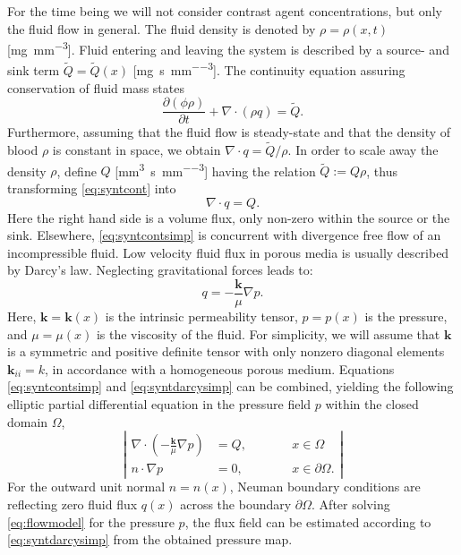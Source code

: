 \documentclass[journal,twocolumn]{IEEEtran}
\newcommand{\siQmm}{\milli\meter\cubed\per\second\per\milli\meter\cubed}
\newcommand{\siQtilde}{\milli\gram\per\second\per\milli\meter\cubed}
\begin{document}
	For the time being we will not consider contrast agent concentrations, but only the fluid flow in general.
	The fluid density is denoted by $\rho = \rho(x,t)$ [\si{\milli\gram\per\mm\cubed}]. 
	Fluid entering and leaving the system is described by a source- and sink term $\tilde{Q} = \tilde{Q}(x)$ [\si{\siQtilde}]. 
	The continuity equation assuring conservation of fluid mass states
	\begin{equation}
		\frac{\partial (\phi \rho)}{\partial t} + \nabla \cdot (\rho q) = \tilde{Q}.
		\label{eq:syntcont}
	\end{equation} 
	Furthermore, assuming that the fluid flow is steady-state and that the density of blood $\rho$ is constant in space, we obtain $\nabla \cdot q = \tilde{Q}/\rho$.
	In order to scale away the density $\rho$, define $Q$ [\si{\siQmm}] having the relation $\tilde{Q} := Q\rho$, thus transforming \eqref{eq:syntcont} into 
	\begin{equation}
		\nabla \cdot q = Q.
		\label{eq:syntcontsimp}
	\end{equation}
	Here the right hand side is a volume flux, only non-zero within the source or the sink. 
	Elsewhere, \eqref{eq:syntcontsimp} is concurrent with divergence free flow of an incompressible fluid.
	Low velocity fluid flux in porous media is usually described by Darcy's law. 	Neglecting gravitational forces \cite{Darcy56} leads to:
	\begin{equation}
		q = -\frac{\mathbf{k}}{\mu} \nabla p.
		\label{eq:syntdarcysimp}
	\end{equation}
	Here, $\mathbf{k} = \mathbf{k}(x)$ is the intrinsic permeability tensor, $p=p(x)$ is the pressure, and $\mu = \mu(x)$ is the viscosity of the fluid. 	
	For simplicity, we will assume that $\mathbf{k}$ is a symmetric and positive definite tensor with only nonzero diagonal elements $\mathbf{k}_{ii} = k$, in accordance with a homogeneous porous medium.	
	Equations \eqref{eq:syntcontsimp} and \eqref{eq:syntdarcysimp} can be combined, yielding the following elliptic partial differential equation in the pressure field $p$ within the closed domain $\Omega$,
	\begin{equation}
		\left\vert
		\begin{alignedat}{2}
			\nabla \cdot \left( -\frac{\mathbf{k}}{\mu} \nabla p \right) &= Q,  \qquad &&x \in \Omega \\
			n \cdot \nabla p &=0, &&x \in \partial \Omega.
		\end{alignedat}
		\right\vert 
		\label{eq:flowmodel}
	\end{equation}
	For the outward unit normal $n=n(x)$, Neuman boundary conditions are reflecting zero fluid flux $q(x)$ across the boundary $\partial \Omega$.
	After solving \eqref{eq:flowmodel} for the pressure $p$, the flux field can be estimated according to \eqref{eq:syntdarcysimp} from the obtained pressure map. 
	
\end{document}
